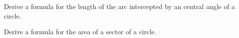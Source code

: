 \begin{prob}
Derive a formula for the length of the arc intercepted by an central angle of a circle.  
\end{prob}

\begin{prob}
Derive a formula for the area of a sector of a circle.  
\end{prob}


